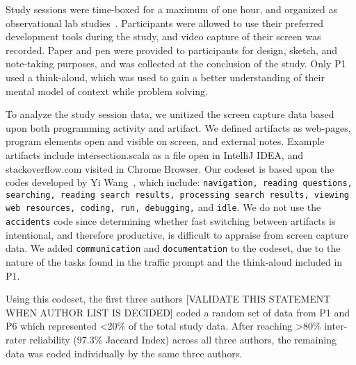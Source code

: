 Study sessions were time-boxed for a maximum of one hour, and organized as observational lab studies~\cite{Easterbrook:2008}. Participants were allowed to use their preferred development tools during the study, and video capture of their screen was recorded. Paper and pen were provided to participants for design, sketch, and note-taking purposes, and was collected at the conclusion of the study. Only P1 used a think-aloud, which was used to gain a better understanding of their mental model of context while problem solving.

To analyze the study session data, we unitized the screen capture data based upon both programming activity and artifact. We defined artifacts as web-pages, program elements open and visible on screen, and external notes. Example artifacts include intersection.scala as a file open in IntelliJ IDEA, and stackoverflow.com visited in Chrome Browser. Our codeset is based upon the codes developed by Yi Wang~\cite{Wang:2017}, which include: \texttt{navigation, reading questions, searching, reading search results, processing search results, viewing web resources, coding, run, debugging,} and \texttt{idle}. We do not use the \texttt{accidents} code since determining whether fast switching between artifacts is intentional, and therefore productive, is difficult to appraise from screen capture data. We added \texttt{communication} and \texttt{documentation} to the codeset, due to the nature of the tasks found in the traffic prompt and the think-aloud included in P1.


Using this codeset, the first three authors [VALIDATE THIS STATEMENT WHEN AUTHOR LIST IS DECIDED] coded a random set of data from P1 and P6 which represented <20\% of the total study data. After reaching >80\% inter-rater reliability (97.3\% Jaccard Index) across all three authors, the remaining data was coded individually by the same three authors.
